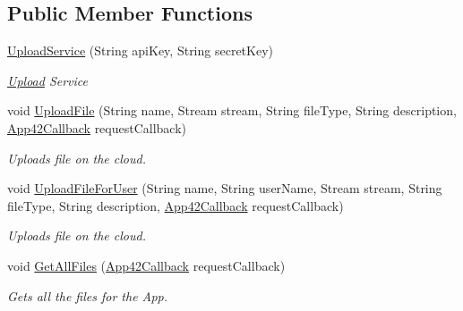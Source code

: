 \subsection*{Public Member Functions}
\begin{DoxyCompactItemize}
\item 
\hyperlink{classcom_1_1shephertz_1_1app42_1_1paas_1_1sdk_1_1windows_1_1upload_1_1_upload_service_ad53689b247f632a4db55434228e7ef22}{Upload\+Service} (String api\+Key, String secret\+Key)
\begin{DoxyCompactList}\small\item\em \hyperlink{classcom_1_1shephertz_1_1app42_1_1paas_1_1sdk_1_1windows_1_1upload_1_1_upload}{Upload} Service \end{DoxyCompactList}\item 
void \hyperlink{classcom_1_1shephertz_1_1app42_1_1paas_1_1sdk_1_1windows_1_1upload_1_1_upload_service_a1f04e93b1b283a8eedc8df37308ae48b}{Upload\+File} (String name, Stream stream, String file\+Type, String description, \hyperlink{interfacecom_1_1shephertz_1_1app42_1_1paas_1_1sdk_1_1windows_1_1_app42_callback}{App42\+Callback} request\+Callback)
\begin{DoxyCompactList}\small\item\em Uploads file on the cloud. \end{DoxyCompactList}\item 
void \hyperlink{classcom_1_1shephertz_1_1app42_1_1paas_1_1sdk_1_1windows_1_1upload_1_1_upload_service_ab2bd2ec8c1dae0097346bd3c7912210b}{Upload\+File\+For\+User} (String name, String user\+Name, Stream stream, String file\+Type, String description, \hyperlink{interfacecom_1_1shephertz_1_1app42_1_1paas_1_1sdk_1_1windows_1_1_app42_callback}{App42\+Callback} request\+Callback)
\begin{DoxyCompactList}\small\item\em Uploads file on the cloud. \end{DoxyCompactList}\item 
void \hyperlink{classcom_1_1shephertz_1_1app42_1_1paas_1_1sdk_1_1windows_1_1upload_1_1_upload_service_a7dfcfa0b0c3bedc1c3db2e9d4f8b5b3d}{Get\+All\+Files} (\hyperlink{interfacecom_1_1shephertz_1_1app42_1_1paas_1_1sdk_1_1windows_1_1_app42_callback}{App42\+Callback} request\+Callback)
\begin{DoxyCompactList}\small\item\em Gets all the files for the App. \end{DoxyCompactList}\item 

\end{DoxyCompactItemize}
